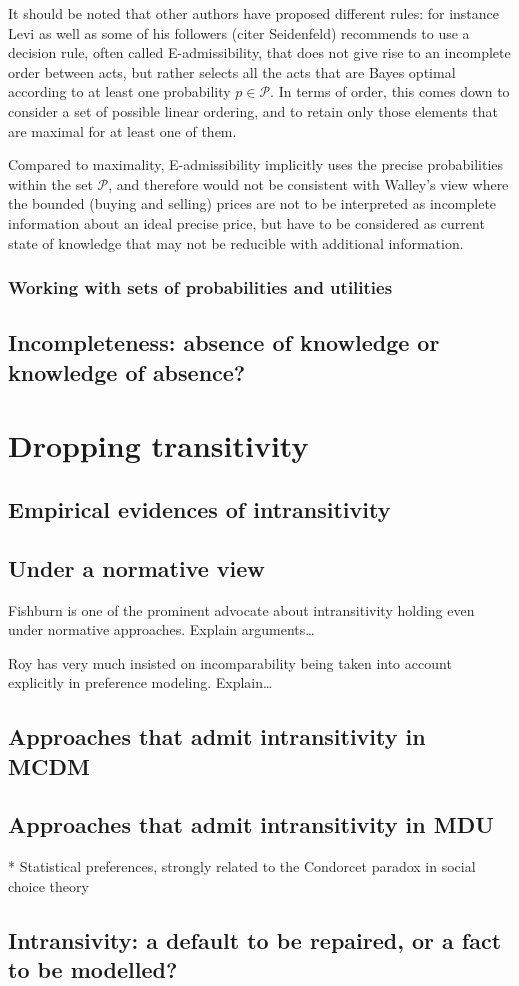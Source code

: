 \documentclass[french, english]{llncs}
\begin{document}
	It should be noted that other authors have proposed different rules: for instance Levi as well as some of his followers (citer Seidenfeld) recommends to use a decision rule, often called E-admissibility, that does not give rise to an incomplete order between acts, but rather selects all the acts that are Bayes optimal according to at least one probability $p \in \mathcal{P}$. In terms of order, this comes down to consider a set of possible linear ordering, and to retain only those elements that are maximal for at least one of them. 
	
	Compared to maximality, E-admissibility implicitly uses the precise probabilities within the set $\mathcal{P}$, and therefore would not be consistent with Walley's view where the bounded (buying and selling) prices are not to be interpreted as incomplete information about an ideal precise price, but have to be considered as current state of knowledge that may not be reducible with additional information. 
	
	\subsubsection{Working with sets of probabilities and utilities}
	
	\subsection{Incompleteness: absence of knowledge or knowledge of absence?}
	
	\section{Dropping transitivity}
	
	\subsection{Empirical evidences of intransitivity}
	
	\subsection{Under a normative view}
	Fishburn is one of the prominent advocate about intransitivity holding even under normative approaches. Explain arguments…
	
	Roy has very much insisted on incomparability being taken into account explicitly in preference modeling. Explain…
	
	\subsection{Approaches that admit intransitivity in MCDM}
	
	\subsection{Approaches that admit intransitivity in MDU}
	
	* Statistical preferences, strongly related to the Condorcet paradox in social choice theory
	
	\subsection{Intransivity: a default to be repaired, or a fact to be modelled?}
	
\end{document}
